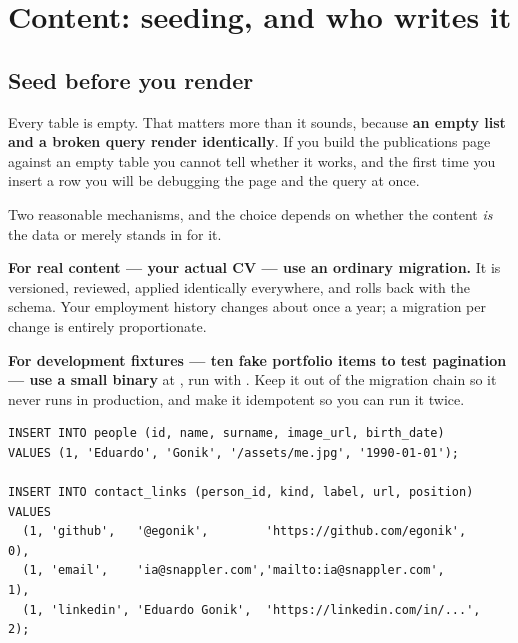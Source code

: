 \chapter{Content: seeding, and who writes it}
\label{ch:seed}

\section{Seed before you render}

Every table is empty. That matters more than it sounds, because \textbf{an empty list and a broken
query render identically}. If you build the publications page against an empty table you cannot
tell whether it works, and the first time you insert a row you will be debugging the page and the
query at once.

\begin{pattern}
Two reasonable mechanisms, and the choice depends on whether the content \emph{is} the data or
merely stands in for it.

\textbf{For real content --- your actual CV --- use an ordinary migration.} It is versioned,
reviewed, applied identically everywhere, and rolls back with the schema. Your employment history
changes about once a year; a migration per change is entirely proportionate.

\textbf{For development fixtures --- ten fake portfolio items to test pagination --- use a small
binary} at , run with . Keep it out
of the migration chain so it never runs in production, and make it idempotent so you can run it
twice.
\end{pattern}

\begin{lstlisting}[style=sql,caption={A seed migration, with explicit foreign keys --- which
is what defect \dnum{1} currently lets you forget.}]
INSERT INTO people (id, name, surname, image_url, birth_date)
VALUES (1, 'Eduardo', 'Gonik', '/assets/me.jpg', '1990-01-01');

INSERT INTO contact_links (person_id, kind, label, url, position) VALUES
  (1, 'github',   '@egonik',        'https://github.com/egonik',            0),
  (1, 'email',    'ia@snappler.com','mailto:ia@snappler.com',               1),
  (1, 'linkedin', 'Eduardo Gonik',  'https://linkedin.com/in/...',          2);
\end{lstlisting}

